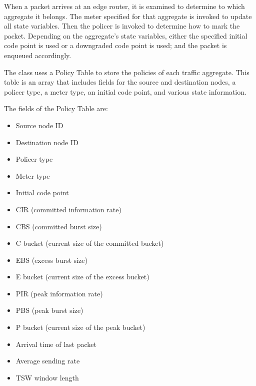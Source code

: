 When a packet arrives at an edge router, it is examined to determine to which 
aggregate it belongs.  The meter specified for that aggregate is invoked to 
update all state variables.  Then the policer is invoked to determine how to 
mark the packet.  Depending on the aggregate's state variables, either the 
specified initial code point is used or a downgraded code point is used; and 
the packet is enqueued accordingly.

The  class uses a Policy Table to store the policies of each 
traffic aggregate.  This table is an array that includes fields for the 
source and destination nodes, a policer type, a meter type, an initial code 
point, and various state information.

The fields of the Policy Table are:
\begin{itemize}
\item
Source node ID
\item
Destination node ID
\item
Policer type
\item
Meter type
\item
Initial code point
\item
CIR (committed information rate)
\item
CBS (committed burst size)
\item
C bucket (current size of the committed bucket)
\item
EBS (excess burst size)
\item
E bucket (current size of the excess bucket)
\item
PIR (peak information rate)
\item
PBS (peak burst size)
\item
P bucket (current size of the peak bucket)
\item
Arrival time of last packet
\item
Average sending rate
\item
TSW window length
\end{itemize}

